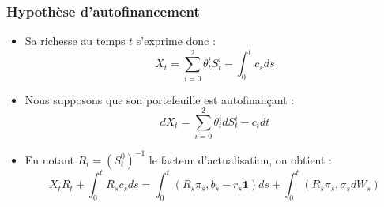 \documentclass{beamer}
\begin{document}
\begin{frame}
\frametitle{Hypothèse d'autofinancement}
\begin{itemize}

\item Sa richesse au temps $t$ s'exprime donc : 
\begin{equation*}
X_t = \displaystyle \sum_{i=0}^{2} \theta^i_t S^i_t - \int_{0}^{t} c_s ds
\end{equation*}

\item Nous supposons que son portefeuille est autofinançant : 
\begin{equation*}
dX_t = \displaystyle \sum_{i=0}^{2} \theta^i_t dS^i_t - c_t dt
\end{equation*}

\item En notant $R_t = (S^0_t)^{-1}$ le facteur d'actualisation, on obtient : 
\begin{equation*}
X_t R_t + \int_{0}^{t} R_s c_s ds = \int_{0}^{t} (R_s \pi_s, b_s - r_s \textbf{1})ds + \int_{0}^{t} (R_s \pi_s, \sigma_s dW_s)
\end{equation*}
\end{itemize}
\end{frame}
\end{document}
